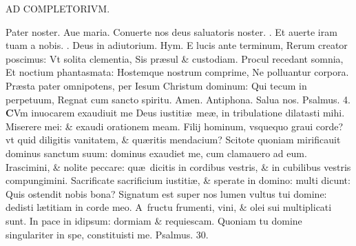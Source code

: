\documentclass[a5paper,10pt]{book}
\def\ae{æ}
\begin{document}
\begin{multicols*}{2}
\begin{center}
AD COMPLETORIVM.
\end{center}
\vspace{-1em}
\par \noindent \color{red} P\color{black}ater noster. Aue maria. Conuerte nos deus saluatoris noster. \color{red} \Rbar . \color{black} Et auerte iram tuam a nobis. \color{red} \Vbar . \color{black} Deus in adiutorium. \color{red} Hym. \color{black}
E lucis ante terminum, Rerum creator poscimus: Vt solita clementia, Sis pr\ae sul \& custodiam.
\newline \color{red} P\color{black}rocul recedant somnia, Et noctium phantasmata: Hostemque nostrum comprime, Ne polluantur corpora.
\newline \color{red} P\color{black}r\ae sta pater omnipotens, per Iesum Christum dominum: Qui tecum in perpetuum, Regnat cum sancto spiritu. Amen.
\newline \color{red} Antiphona. \color{black} Salua nos. \color{red} Psalmus. 4. \color{black}
\vspace{-.5em}
\lettrine[lines=2]{\bfseries \color{red} C}{}Vm inuocarem exaudiuit me Deus iustiti\ae \ me\ae , in tribulatione dilatasti mihi.
\newline \color{red} M\color{black}iserere mei: \& exaudi orationem meam.
\newline \color{red} F\color{black}ilij hominum, vsquequo graui corde? vt quid diligitis vanitatem, \& qu\ae ritis mendacium?
\newline \color{red} S\color{black}citote quoniam mirificauit dominus sanctum suum: dominus exaudiet me, cum clamauero ad eum.
\newline \color{red} I\color{black}rascimini, \& nolite peccare: qu\ae \ dicitis in cordibus vestris, \& in cubilibus vestris compungimini.
\newline \color{red} S\color{black}acrificate sacrificium iustiti\ae , \& sperate in domino: multi dicunt: Quis ostendit nobis bona?
\newline \color{red} S\color{black}ignatum est super nos lumen vultus tui domine: dedisti l\ae titiam in corde meo.
\newline \color{red} A\color{black}\ fructu frumenti, vini, \& olei sui multiplicati sunt.
\newline \color{red} I\color{black}n pace in idipsum: dormiam \& requiescam.
\newline \color{red} Q\color{black}uoniam tu domine singulariter in spe, constituisti me. \quad \color{red} Psalmus. 30. \color{black}

\end{multicols*}
\end{document}
